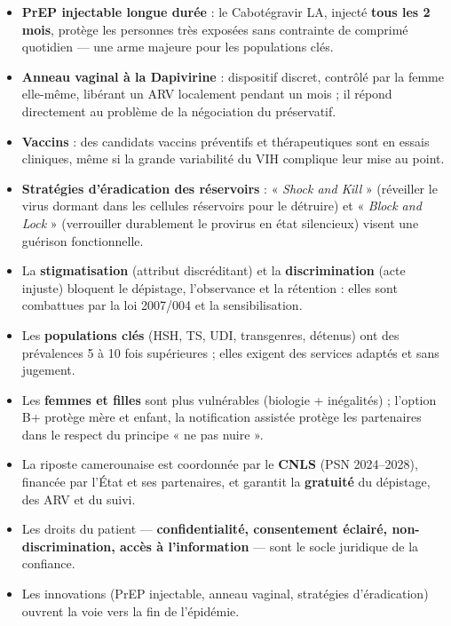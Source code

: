 \documentclass[11pt]{article}
\newcommand{\cle}[1]{{\popxbold\color{popdark}#1}}
\begin{document}
\begin{itemize}
\item \textbf{PrEP injectable longue durée} : le \cle{Cabotégravir LA}, injecté \textbf{tous les 2 mois}, protège les personnes très exposées sans contrainte de comprimé quotidien — une arme majeure pour les populations clés.
\item \textbf{Anneau vaginal à la Dapivirine} : dispositif discret, contrôlé par la femme elle-même, libérant un ARV localement pendant un mois ; il répond directement au problème de la négociation du préservatif.
\item \textbf{Vaccins} : des candidats vaccins préventifs et thérapeutiques sont en essais cliniques, même si la grande variabilité du VIH complique leur mise au point.
\item \textbf{Stratégies d'éradication des réservoirs} : « \emph{Shock and Kill} » (réveiller le virus dormant dans les cellules réservoirs pour le détruire) et « \emph{Block and Lock} » (verrouiller durablement le provirus en état silencieux) visent une guérison fonctionnelle.
\end{itemize}

\begin{aretenir}
\begin{itemize}
\item La \textbf{stigmatisation} (attribut discréditant) et la \textbf{discrimination} (acte injuste) bloquent le dépistage, l'observance et la rétention : elles sont combattues par la loi 2007/004 et la sensibilisation.
\item Les \textbf{populations clés} (HSH, TS, UDI, transgenres, détenus) ont des prévalences 5 à 10 fois supérieures ; elles exigent des services adaptés et sans jugement.
\item Les \textbf{femmes et filles} sont plus vulnérables (biologie + inégalités) ; l'option B+ protège mère et enfant, la notification assistée protège les partenaires dans le respect du principe « ne pas nuire ».
\item La riposte camerounaise est coordonnée par le \textbf{CNLS} (PSN 2024--2028), financée par l'État et ses partenaires, et garantit la \textbf{gratuité} du dépistage, des ARV et du suivi.
\item Les droits du patient — \textbf{confidentialité, consentement éclairé, non-discrimination, accès à l'information} — sont le socle juridique de la confiance.
\item Les innovations (PrEP injectable, anneau vaginal, stratégies d'éradication) ouvrent la voie vers la fin de l'épidémie.
\end{itemize}
\end{aretenir}
\end{document}
